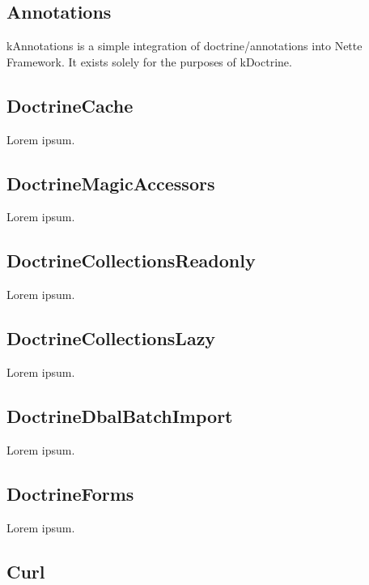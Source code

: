 \tocless\subsection{Annotations} \label{sec:state:annotations}

\gls{kAnnotations} is a simple integration of doctrine/annotations into Nette Framework. It exists solely for the purposes of \gls{kDoctrine}.

\tocless\subsection{DoctrineCache} \label{sec:state:doctrine-cache}

Lorem ipsum.

\tocless\subsection{DoctrineMagicAccessors} \label{sec:state:doctrine-magic-accessors}

Lorem ipsum.

\tocless\subsection{DoctrineCollectionsReadonly} \label{sec:state:doctrine-collections-readonly}

Lorem ipsum.

\tocless\subsection{DoctrineCollectionsLazy} \label{sec:state:doctrine-collections-lazy}

Lorem ipsum.

\tocless\subsection{DoctrineDbalBatchImport} \label{sec:state:doctrine-dbal-batch-import}

Lorem ipsum.

\tocless\subsection{DoctrineForms} \label{sec:state:doctrine-forms}

Lorem ipsum.

\tocless\subsection{Curl} \label{sec:state:curl}

